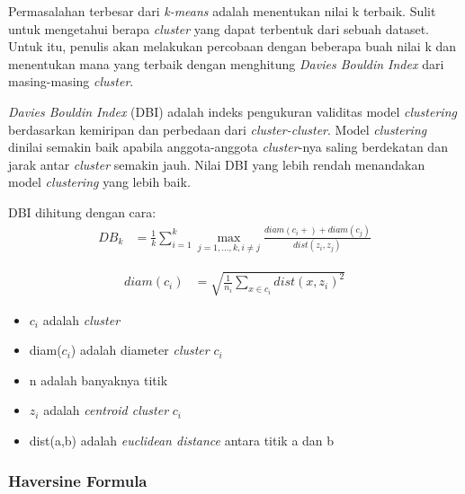 \documentclass{article}
\begin{document}
\begin{adjustwidth}{4em}{0pt}

\hspace{\parindent}Permasalahan terbesar dari \textit{k-means} adalah menentukan nilai k terbaik. Sulit untuk mengetahui berapa \textit{cluster} yang dapat terbentuk dari sebuah dataset. Untuk itu, penulis akan melakukan percobaan dengan beberapa buah nilai k dan menentukan mana yang terbaik dengan menghitung \textit{Davies Bouldin Index} dari masing-masing \textit{cluster}.

\textit{Davies Bouldin Index} (DBI) adalah indeks pengukuran validitas model \textit{clustering} berdasarkan kemiripan dan perbedaan dari \textit{cluster-cluster}. Model \textit{clustering} dinilai semakin baik apabila anggota-anggota \textit{cluster}-nya saling berdekatan dan jarak antar \textit{cluster} semakin jauh. Nilai DBI yang lebih rendah menandakan model \textit{clustering} yang lebih baik.

DBI dihitung dengan cara:
\begin{align*}
DB_{k} &= \frac{1}{k}\sum\limits_{i=1}^k
\max\limits_{j=1,...,k,i\neq j}\frac{diam(c_i +) + diam(c_j)}{dist(z_i,z_j)}
\end{align*}

\begin{align*}
diam(c_i) &= \sqrt{\frac{1}{n_i}\sum\limits_{x\in c_i}dist(x,z_i)^2}
\end{align*}

\begin{itemize}
	\setlength{\itemindent}{1cm}
	\item{$c_i$ adalah \textit{cluster}}
	\item{diam($c_i$) adalah diameter \textit{cluster} $c_i$}
	\item{n adalah banyaknya titik}
	\item{$z_i$ adalah \textit{centroid cluster} $c_i$}
	\item{dist(a,b) adalah \textit{euclidean distance} antara titik a dan b}
\end{itemize}

\end{adjustwidth}

\subsubsection{Haversine Formula}
\end{document}
